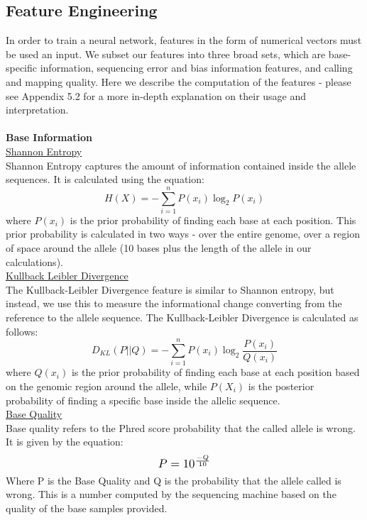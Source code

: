 \documentclass{article}
\begin{document}
\subsection{Feature Engineering}
In order to train a neural network, features in the form of numerical vectors must be used an input. We subset our features into three broad sets, which are base-specific information, sequencing error and bias information features, and calling and mapping quality. Here we describe the computation of the features - please see Appendix 5.2 for a more in-depth explanation on their usage and interpretation.\\\\
\textbf{Base Information} \\[0.3\baselineskip]
\underline{Shannon Entropy}\\
Shannon Entropy captures the amount of information contained inside the allele sequences. It is calculated using the equation:
\begin{equation}
H(X) = -\sum_{i=1}^{n}P(x_i)\log_{2}P(x_i)
\end{equation}
where $P(x_i)$ is the prior probability of finding each base at each position. This prior probability is calculated in two ways - over the entire genome, over a region of space around the allele (10 bases plus the length of the allele in our calculations).\\[0.3\baselineskip]
\underline{Kullback Leibler Divergence}\\
The Kullback-Leibler Divergence feature is similar to Shannon entropy, but instead, we use this to measure the informational change converting from the reference to the allele sequence. The Kullback-Leibler Divergence is calculated as follows:
\begin{equation}
D_{KL}(P||Q) = -\sum_{i=1}^{n}P(x_i)\log_{2}{\frac{P(x_i)}{Q(x_i)}}
\end{equation}
where $Q(x_i)$ is the prior probability of finding each base at each position based on the genomic region around the allele, while $P(X_i)$ is the posterior probability of finding a specific base inside the allelic sequence.\\[0.3\baselineskip]
\underline{Base Quality}\\
Base quality refers to the Phred score probability that the called allele is wrong. It is given by the equation:
\[ \scalebox{1.2}{$P=10^{\frac{-Q}{10}}$} \]
Where P is the Base Quality and Q is the probability that the allele called is wrong. This is a number computed by the sequencing machine based on the quality of the base samples provided.\\\\
\end{document}
